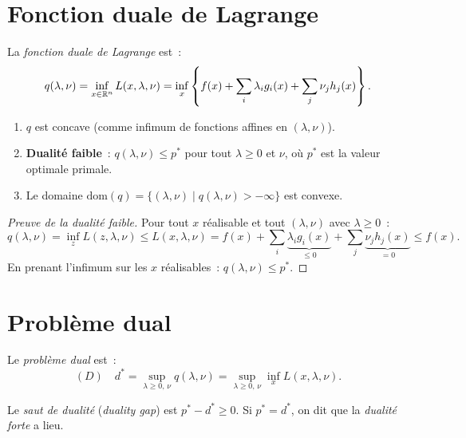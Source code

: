 \section{Fonction duale de Lagrange}

\begin{definition}
La \emph{fonction duale de Lagrange} est~:
\[
    q(\lambda, \nu) = \inf_{x \in \mathbb{R}^n} L(x, \lambda, \nu)
    = \inf_x \left\{f(x) + \sum_i \lambda_i g_i(x) + \sum_j \nu_j h_j(x)\right\}.
\]
\end{definition}

\begin{theoreme}
\label{thm:duale}
\begin{enumerate}
    \item $q$ est concave (comme infimum de fonctions affines en $(\lambda, \nu)$).
    \item \textbf{Dualit\'e faible}~: $q(\lambda, \nu) \leq p^*$ pour tout
    $\lambda \geq 0$ et $\nu$, o\`u $p^*$ est la valeur optimale primale.
    \item Le domaine $\mathrm{dom}(q) = \{(\lambda,\nu) \mid q(\lambda,\nu) > -\infty\}$
    est convexe.
\end{enumerate}
\end{theoreme}

\begin{proof}[Preuve de la dualit\'e faible]
Pour tout $x$ r\'ealisable et tout $(\lambda, \nu)$ avec $\lambda \geq 0$~:
\[
    q(\lambda, \nu) = \inf_{z} L(z, \lambda, \nu) \leq L(x, \lambda, \nu)
    = f(x) + \sum_i \underbrace{\lambda_i g_i(x)}_{\leq 0}
    + \sum_j \underbrace{\nu_j h_j(x)}_{= 0} \leq f(x).
\]
En prenant l'infimum sur les $x$ r\'ealisables~: $q(\lambda, \nu) \leq p^*$.
\end{proof}

\section{Probl\`eme dual}

\begin{definition}
Le \emph{probl\`eme dual} est~:
\[
    (D) \quad d^* = \sup_{\lambda \geq 0, \, \nu} q(\lambda, \nu)
    = \sup_{\lambda \geq 0, \, \nu} \inf_x L(x, \lambda, \nu).
\]
\end{definition}

\begin{definition}
Le \emph{saut de dualit\'e} (\emph{duality gap}) est $p^* - d^* \geq 0$.
Si $p^* = d^*$, on dit que la \emph{dualit\'e forte} a lieu.
\end{definition}


